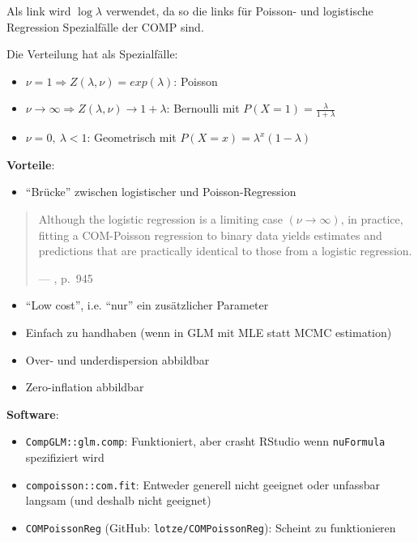 \documentclass[ngerman,a4paper,]{scrartcl}
\providecommand{\tightlist}{%
  \setlength{\itemsep}{0pt}\setlength{\parskip}{0pt}}
\theoremstyle{definition}
\theoremstyle{definition}
\theoremstyle{definition}
\theoremstyle{remark}
\begin{document}
Als link wird \(\log \lambda\) verwendet, da so die links für Poisson- und logistische Regression Spezialfälle der COMP sind.

Die Verteilung hat als Spezialfälle:

\begin{itemize}
\tightlist
\item
  \(\nu = 1 \Longrightarrow Z(\lambda, \nu) = exp(\lambda)\): Poisson
\item
  \(\nu \to \infty \Longrightarrow Z(\lambda, \nu) \to 1 + \lambda\): Bernoulli mit \(P(X = 1) = \frac{\lambda}{1+\lambda}\)
\item
  \(\nu = 0,\ \lambda < 1\): Geometrisch mit \(P(X = x) = \lambda^x (1 - \lambda)\)
\end{itemize}

\textbf{Vorteile}:

\begin{itemize}
\tightlist
\item
  \enquote{Brücke} zwischen logistischer und Poisson-Regression \citep{sellers2010FlexibleRegression}
\end{itemize}

\begin{quote}
Although the logistic regression is a limiting case \((\nu \to \infty)\), in practice, fitting a COM-Poisson regression to binary data yields estimates and predictions that are practically identical to those from a logistic regression.

--- \citet{sellers2010FlexibleRegression}, p.~945
\end{quote}

\begin{itemize}
\tightlist
\item
  \enquote{Low cost}, i.e. \enquote{nur} ein zusätzlicher Parameter
\item
  Einfach zu handhaben (wenn in GLM mit MLE statt MCMC estimation)
\item
  Over- und underdispersion abbildbar
\item
  Zero-inflation abbildbar
\end{itemize}

\textbf{Software}:

\begin{itemize}
\tightlist
\item
  \texttt{CompGLM::glm.comp}: Funktioniert, aber crasht RStudio wenn \texttt{nuFormula} spezifiziert wird
\item
  \texttt{compoisson::com.fit}: Entweder generell nicht geeignet oder unfassbar langsam (und deshalb nicht geeignet)
\item
  \texttt{COMPoissonReg} (GitHub: \texttt{lotze/COMPoissonReg}): Scheint zu funktionieren
\end{itemize}
\end{document}
